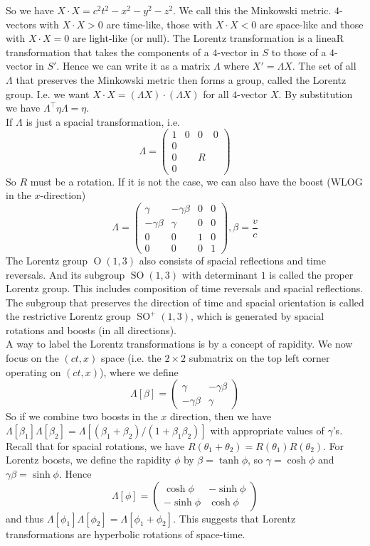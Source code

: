 So we have $X\cdot X=c^2t^2-x^2-y^2-z^2$.
We call this the Minkowski metric.
$4$-vectors with $X\cdot X>0$ are time-like, those with $X\cdot X<0$ are space-like and those with $X\cdot X=0$ are light-like (or null).
The Lorentz transformation is a lineaR transformation that takes the components of a $4$-vector in $S$ to those of a $4$-vector in $S'$.
Hence we can write it as a matrix $\Lambda$ where $X'=\Lambda X$.
The set of all $\Lambda$ that preserves the Minkowski metric then forms a group, called the Lorentz group.
I.e. we want $X\cdot X=(\Lambda X)\cdot (\Lambda X)$ for all $4$-vector $X$.
By substitution we have $\Lambda^\top\eta\Lambda=\eta$.\\
If $\Lambda$ is just a spacial transformation, i.e.
$$\Lambda=\begin{pmatrix}
    1&0&0&0\\
    0&&&\\
    0&&R&\\
    0&&&
\end{pmatrix}$$
So $R$ must be a rotation.
If it is not the case, we can also have the boost (WLOG in the $x$-direction)
$$\Lambda=\begin{pmatrix}
    \gamma&-\gamma\beta&0&0\\
    -\gamma\beta&\gamma&0&0\\
    0&0&1&0\\
    0&0&0&1
\end{pmatrix},\beta=\frac{v}{c}$$
The Lorentz group $\operatorname{O}(1,3)$ also consists of spacial reflections and time reversals.
And its subgroup $\operatorname{SO}(1,3)$ with determinant $1$ is called the proper Lorentz group.
This includes composition of time reversals and spacial reflections.
The subgroup that preserves the direction of time and spacial orientation is called the restrictive Lorentz group $\operatorname{SO}^+(1,3)$, which is generated by spacial rotations and boosts (in all directions).\\
A way to label the Lorentz transformations is by a concept of rapidity.
We now focus on the $(ct,x)$ space (i.e. the $2\times 2$ submatrix on the top left corner operating on $(ct,x)$), where we define
$$\Lambda[\beta]=\begin{pmatrix}
    \gamma&-\gamma\beta\\
    -\gamma\beta&\gamma
\end{pmatrix}$$
So if we combine two boosts in the $x$ direction, then we have $\Lambda[\beta_1]\Lambda[\beta_2]=\Lambda[(\beta_1+\beta_2)/(1+\beta_1\beta_2)]$ with appropriate values of $\gamma$'s.
Recall that for spacial rotations, we have $R(\theta_1+\theta_2)=R(\theta_1)R(\theta_2)$.
For Lorentz boosts, we define the rapidity $\phi$ by $\beta=\tanh\phi$, so $\gamma=\cosh\phi$ and $\gamma\beta=\sinh\phi$.
Hence
$$\Lambda[\phi]=\begin{pmatrix}
    \cosh\phi&-\sinh\phi\\
    -\sinh\phi&\cosh\phi
\end{pmatrix}$$
and thus $\Lambda[\phi_1]\Lambda[\phi_2]=\Lambda[\phi_1+\phi_2]$.
This suggests that Lorentz transformations are hyperbolic rotations of space-time.
